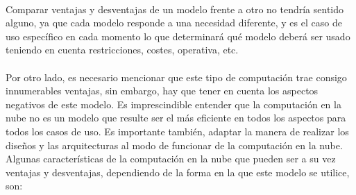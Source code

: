 \documentclass[../../memoria.tex]{subfiles}
\begin{document}
\paragraph{}
Comparar ventajas y desventajas de un modelo frente a otro no tendría sentido alguno, ya que cada modelo responde a una necesidad diferente, y es el caso de uso específico en cada momento lo que determinará qué modelo deberá ser usado teniendo en cuenta restricciones, costes, operativa, etc.

\paragraph{}
Por otro lado, es necesario mencionar que este tipo de computación trae consigo innumerables ventajas, sin embargo, hay que tener en cuenta los aspectos negativos de este modelo. Es imprescindible entender que la
computación en la nube no es un modelo que resulte ser el más eficiente en todos los aspectos para todos los casos de uso. Es importante también, adaptar la manera de realizar los diseños y las arquitecturas al modo de funcionar de la computación en la nube. Algunas características de la computación en la nube que pueden ser a su vez ventajas y desventajas, dependiendo de la forma en la que este modelo se utilice, son:
\end{document}
